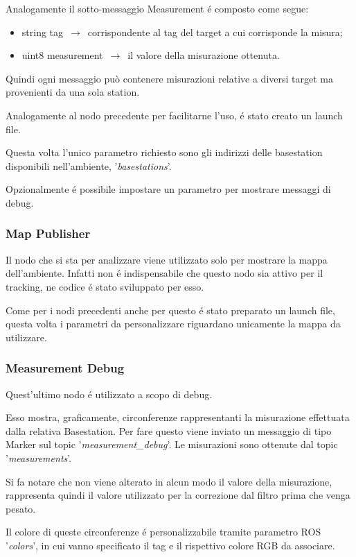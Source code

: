 \documentclass{article}
\begin{document}
Analogamente il sotto-messaggio Measurement \'e composto come segue:
\begin{itemize}
	\item string tag $\,\to\,$ corrispondente al tag del target a cui corrisponde la misura;
	\item uint8 measurement $\,\to\,$ il valore della misurazione ottenuta.
\end{itemize}


Quindi ogni messaggio pu\`o contenere misurazioni relative a diversi target ma provenienti da una sola station.

Analogamente al nodo precedente per facilitarne l'uso, \'e stato creato un launch file.

Questa volta l'unico parametro richiesto sono gli indirizzi delle basestation disponibili nell'ambiente, '\textit{basestations}'.

Opzionalmente \'e possibile impostare un parametro per mostrare messaggi di debug.


\subsubsection{Map Publisher}
Il nodo che si sta per analizzare viene utilizzato solo per mostrare la mappa dell'ambiente.
Infatti non \'e indispensabile che questo nodo sia attivo per il tracking, ne codice \'e stato sviluppato per esso.

Come per i nodi precedenti anche per questo \'e stato preparato un launch file, questa volta i parametri da personalizzare riguardano unicamente la mappa da utilizzare.



\subsubsection{Measurement Debug}
Quest'ultimo nodo \'e utilizzato a scopo di debug.

Esso mostra, graficamente, circonferenze rappresentanti la misurazione effettuata dalla relativa Basestation. Per fare questo viene inviato un messaggio di tipo Marker sul topic '\textit{measurement\_debug}'.
Le misurazioni sono ottenute dal topic '\textit{measurements}'.

Si fa notare che non viene alterato in alcun modo il valore della misurazione, rappresenta quindi il valore utilizzato per la correzione dal filtro prima che venga pesato.

Il colore di queste circonferenze \'e personalizzabile tramite parametro ROS '\textit{colors}', in cui vanno specificato il tag e il rispettivo colore RGB da associare.
\end{document}

